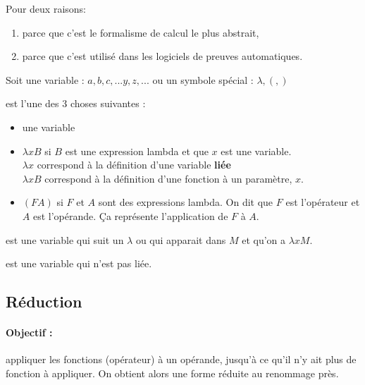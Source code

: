 \begin{myrem}
	Pour deux raisons:
	\begin{enumerate}
		\item parce que c'est le formalisme de calcul le plus abstrait,
		\item parce que c'est utilisé dans les logiciels de preuves automatiques.
	\end{enumerate}
\end{myrem}

\begin{mydef} Soit une variable : $a,b,c,...y,z,...$ ou un
	symbole spécial : $\lambda, (, )$
\end{mydef}

\begin{mydef} est l'une des 3 choses suivantes :
	\begin{itemize}
		\item une variable
		\item $\lambda xB$ si $B$ est une expression lambda et que $x$ est
			une variable. \\
			$\lambda x$ correspond à la définition
			d'une variable \textbf{liée} \\
			$\lambda xB$ correspond à la définition d'une fonction
			à un paramètre, $x$.
		\item $(FA)$ si $F$ et $A$ sont des expressions lambda. On dit que $F$
			est l'opérateur et $A$ est l'opérande. Ça représente
			l'application de $F$ à $A$.
	\end{itemize}
\end{mydef}

\begin{mydef} est une variable qui suit un $\lambda$ ou qui
	apparait dans $M$ et qu'on a $\lambda xM$.
\end{mydef}

\begin{mydef} est une variable qui n'est pas liée.
\end{mydef}

\subsection{Réduction}

\paragraph{Objectif :} appliquer les fonctions (opérateur) à un opérande,
jusqu'à ce qu'il n'y ait plus de fonction à appliquer. On obtient alors une
forme réduite au renommage près.

